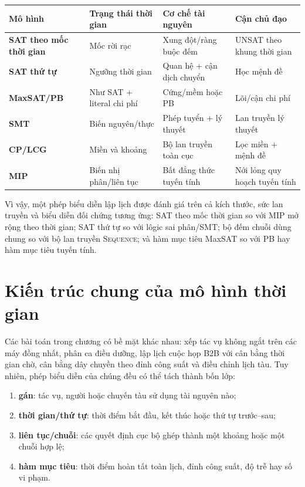 \begin{center}
\label{tab:scheduling-paradigms}
\begin{tabularx}{\textwidth}{@{}>{\bfseries\sffamily}p{}YYY@{}}
\toprule
Mô hình & Trạng thái thời gian & Cơ chế tài nguyên & Cận chủ đạo\\
\midrule
SAT theo mốc thời gian & Mốc rời rạc & Xung đột/ràng buộc đếm & UNSAT theo khung thời gian\\
SAT thứ tự & Ngưỡng thời gian & Quan hệ + cận dịch chuyển & Học mệnh đề\\
MaxSAT/PB & Như SAT + literal chi phí & Cứng/mềm hoặc PB & Lõi/cận chi phí\\
SMT & Biến nguyên/thực & Phép tuyển + lý thuyết & Lan truyền lý thuyết\\
CP/LCG & Miền và khoảng & Bộ lan truyền toàn cục & Lọc miền + mệnh đề\\
MIP & Biến nhị phân/liên tục & Bất đẳng thức tuyến tính & Nới lỏng quy hoạch tuyến tính\\
\bottomrule
\end{tabularx}
\end{center}

Vì vậy, một phép biểu diễn lập lịch được đánh giá trên cả kích thước, sức lan
truyền và biểu diễn đối chứng tương ứng: SAT theo mốc thời gian so với MIP mở
rộng theo thời gian; SAT thứ tự so với lôgic sai phân/SMT; bộ đếm chuỗi dùng
chung so với bộ lan truyền \textsc{Sequence}; và hàm mục tiêu MaxSAT so với PB
hay hàm mục tiêu tuyến tính.

\section{Kiến trúc chung của mô hình thời gian}

Các bài toán trong chương có bề mặt khác nhau: xếp tác vụ không ngắt
trên các máy đồng nhất, phân ca điều dưỡng, lập lịch cuộc họp B2B với cân bằng thời
gian chờ, cân bằng dây chuyền theo đỉnh công suất và điều chỉnh lịch tàu. Tuy
nhiên, phép biểu diễn của chúng đều có thể tách thành bốn lớp:
\begin{enumerate}
  \item \textbf{gán}: tác vụ, người hoặc chuyến tàu sử dụng tài nguyên nào;
  \item \textbf{thời gian/thứ tự}: thời điểm bắt đầu, kết thúc hoặc thứ tự trước--sau;
  \item \textbf{liên tục/chuỗi}: các quyết định cục bộ ghép thành một
        khoảng hoặc một chuỗi hợp lệ;
  \item \textbf{hàm mục tiêu}: thời điểm hoàn tất toàn lịch, đỉnh công suất,
        độ trễ hay số vi phạm.
\end{enumerate}

